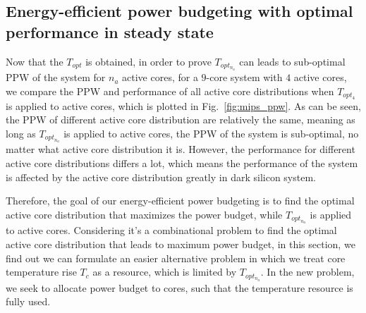 \subsection{Energy-efficient power budgeting with optimal performance in steady state}
Now that the $T_{opt}$ is obtained, in order to prove $T_{opt_{n_{a}}}$ can leads to sub-optimal PPW of the system for $n_{a}$ active cores, for a $9$-core system with $4$ active cores, we compare the PPW and performance of all active core distributions when $T_{opt_{4}}$ is applied to active cores, which is plotted in Fig.~\ref{fig:mips_ppw}. As can be seen, the PPW of different active core distribution are relatively the same, meaning as long as $T_{opt_{n_{a}}}$ is applied to active cores, the PPW of the system is sub-optimal, no matter what active core distribution it is. However, the performance for different active core distributions differs a lot, which means the performance of the system is affected by the active core distribution greatly in dark silicon system.

Therefore, the goal of our energy-efficient power budgeting is to find the optimal active core distribution that maximizes the power budget, while $T_{opt_{n_{a}}}$ is applied to active cores. Considering it's a combinational problem to find the optimal active core distribution that leads to maximum power budget, in this section, we find out we can formulate an easier alternative problem in which we treat core temperature rise $T_{c}$ as a resource, which is limited by $T_{opt_{n_{a}}}$. In the new problem, we seek to allocate power budget to cores, such that the temperature resource is fully used.

